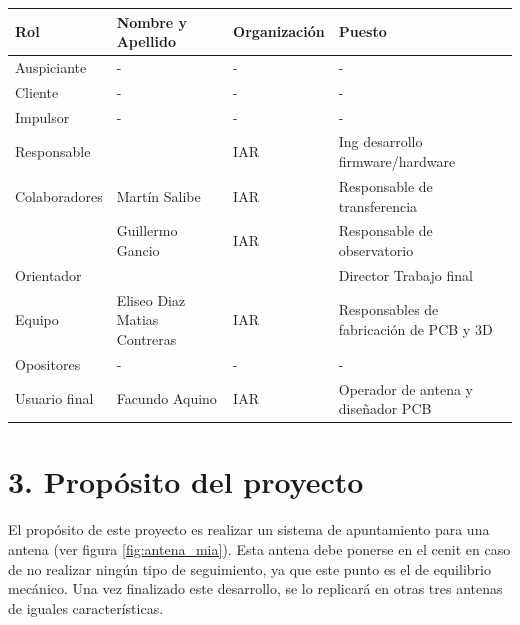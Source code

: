 \documentclass[11pt, %
codirector, %
]{charter}
\begin{document}
\begin{table}[ht]
\renewcommand {\arrayrulewidth}{1pt}
\begin{tabularx}{\linewidth}{@{}|l|X|X|l|@{}}
	\hline
	\rowcolor[HTML]{C0C0C0} 
	Rol           & Nombre y Apellido & Organización 	& Puesto 	\\ \hline
	Auspiciante   & -                 &  -             	& -        	\\ \hline
	Cliente       & -  			      &	 -				& -       	\\ \hline
	Impulsor      &  -                & -             	& -       	\\ \hline
	Responsable   & \authorname       & IAR        	    & Ing desarrollo firmware/hardware 	\\ \hline
	Colaboradores & Martín Salibe     & IAR             & Responsable de transferencia \\
				  &  Guillermo Gancio & IAR             & Responsable de observatorio \\ \hline
	Orientador    & \supname	      & \pertesupname 	& Director Trabajo final \\ \hline
	Equipo        & Eliseo Diaz \newline 
	Matias Contreras          & IAR              	& Responsables de fabricación de PCB y 3D  	\\ \hline
	Opositores    &  -                 & -             	& -        	\\ \hline
	Usuario final & Facundo Aquino     & IAR           	& Operador de antena  y diseñador PCB    	\\ \hline
\end{tabularx}
\end{table}




\section{3. Propósito del proyecto}
\label{sec:proposito}
	El propósito de este proyecto es realizar un sistema de apuntamiento para una antena (ver figura \ref{fig:antena_mia}). Esta antena debe ponerse en el cenit en caso de no realizar ningún tipo de seguimiento, ya que este punto es el de equilibrio mecánico. Una vez finalizado este desarrollo, se lo replicará en otras tres antenas de iguales características. 
\end{document}
